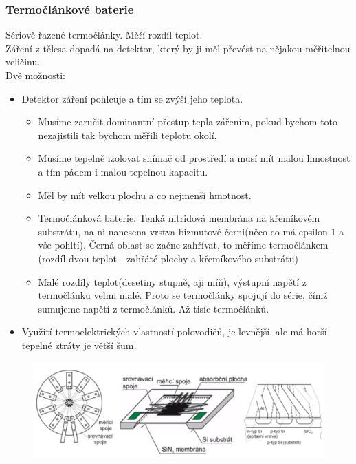 \subsubsection*{Termočlánkové baterie}
Sériově řazené termočlánky. Měří rozdíl teplot.\\
Záření z tělesa dopadá na detektor, který by ji měl převést na nějakou měřitelnou veličinu.\\
Dvě možnosti:
\begin{itemize}
    \item Detektor záření pohlcuje a tím se zvýší jeho teplota.
          \begin{itemize}
              \item Musíme zaručit dominantní přestup tepla zářením, pokud bychom toto nezajistili tak bychom měřili teplotu okolí.
              \item Musíme tepelně izolovat snímač od prostředí a musí mít malou hmostnost a tím pádem i malou tepelnou kapacitu.
              \item Měl by mít velkou plochu a co nejmenší hmotnost.
              \item Termočlánková baterie. Tenká nitridová membrána na křemíkovém substrátu, na ni nanesena vrstva bizmutové černi(něco co má epsilon 1 a vše pohltí). Černá oblast se začne zahřívat, to měříme termočlánkem (rozdíl dvou teplot - zahřáté plochy a křemíkového substrátu)
              \item Malé rozdíly teplot(desetiny stupně, aji míň), výstupní napětí z termočlánku velmi malé. Proto se termočlánky spojují do série, čímž sumujeme napětí z termočlánků. Až tisíc termočlánků.\\
          \end{itemize}
    \item Využití termoelektrických vlastností polovodičů, je levnější, ale má horší tepelné ztráty je větší šum.
\end{itemize}
\begin{figure}[h!]
    \centering
    \includegraphics[scale = 0.5]{img/TermBat.png}
\end{figure}
